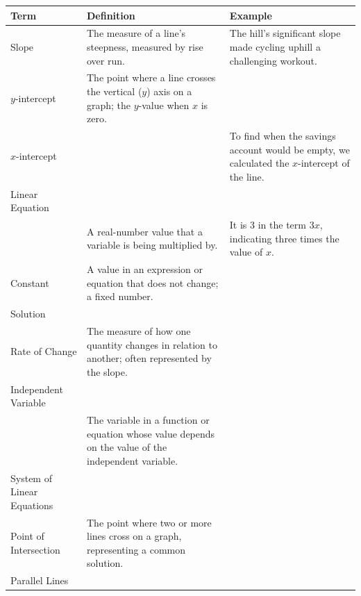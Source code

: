 \documentclass{article}
\begin{document}
\begin{tabularx}{\textwidth}{|l|X|X|}
\hline
\textbf{Term} & \textbf{Definition} & \textbf{Example}\\
\hline
Slope & The measure of a line's steepness, measured by rise over run. & The hill's significant slope made cycling uphill a challenging workout. \\[.5in]
\hline
$y$-intercept & The point where a line crosses the vertical ($y$) axis on a graph; the $y$-value when $x$ is zero. & \\[.5in]
\hline
$x$-intercept & & To find when the savings account would be empty, we calculated the $x$-intercept of the line. \\[.5in]
\hline
Linear Equation & & \\[.5in]
\hline
 & A real-number value that a variable is being multiplied by. & It is 3 in the term $3x$, indicating three times the value of $x$. \\[.5in]
\hline
Constant & A value in an expression or equation that does not change; a fixed number. & \\[.5in]
\hline
Solution & & \\[.5in]
\hline
Rate of Change & The measure of how one quantity changes in relation to another; often represented by the slope. & \\[.5in]
\hline
Independent Variable & & \\[.5in]
\hline
 & The variable in a function or equation whose value depends on the value of the independent variable. & \\[.5in]
\hline
System of Linear Equations & & \\[.5in]
\hline
Point of Intersection & The point where two or more lines cross on a graph, representing a common solution. & \\[.5in]
\hline
Parallel Lines & & \\[.5in]
\hline
\end{tabularx}
\end{document}

